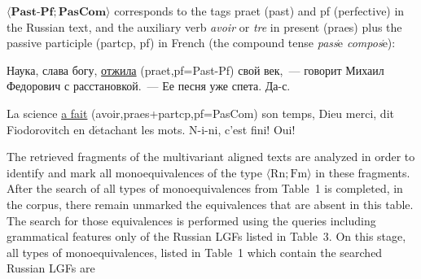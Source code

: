 \begin{multicols}{2}
   $\langle\mathbf{Past}\mbox{-}\mathbf{Pf;PasCom}\rangle$ corresponds to the tags praet 
(past) and pf (perfective) in the Russian text, and the auxiliary verb \textit{avoir} or 
\textit{{\!}tre} in present (praes) plus the passive participle (partcp, pf) in French (the 
compound tense \textit{pass$\acute{\mbox{e}}$ compos$\acute{\mbox{e}}$}):
   
   Наука, слава богу, \underline{отжила} (praet,pf\;=\;Past-Pf) свой век,~--- говорит Михаил 
Федорович с расстановкой.~--- Ее песня уже спета. Да-с.
   
   La science \underline{a fait} (avoir,praes\;+\;partcp,pf\linebreak =\;PasCom) son temps, Dieu merci, dit 
Fiodorovitch en d$\acute{\mbox{e}}$tachant les mots. N-i-ni, c'est fini! Oui!
   
   The retrieved fragments of the multivariant aligned texts are analyzed in order to identify and 
mark all monoequivalences of the type $\langle \mathrm{Rn}; \mathrm{Fm}\rangle$ in these fragments. After the search 
of all types of monoequivalences from Table~1 is completed, in the corpus, there remain unmarked the 
equivalences that are absent in this table. The search for those equivalences is performed using 
the queries including grammatical features only of the Russian LGFs listed in Table~3. On this 
stage, all types of monoequivalences, listed in Table~1 which contain the searched Russian 
LGFs are\linebreak\vspace*{-12pt}

\pagebreak

\end{multicols}

